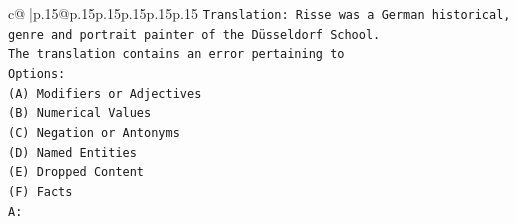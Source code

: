 \documentclass{article}
\begin{document}
{\begin{supertabular}{c@{$\;$}|p{.15\linewidth}@{}p{.15\linewidth}p{.15\linewidth}p{.15\linewidth}p{.15\linewidth}p{.15\linewidth}}
{{{\texttt{Translation: Risse was a German historical, genre and portrait painter of the Düsseldorf School.} \\
\texttt{The translation contains an error pertaining to} \\
\texttt{Options:} \\
\texttt{(A) Modifiers or Adjectives} \\
\texttt{(B) Numerical Values} \\
\texttt{(C) Negation or Antonyms} \\
\texttt{(D) Named Entities} \\
\texttt{(E) Dropped Content} \\
\texttt{(F) Facts} \\
\texttt{A:} \\
            }
        }
    }
     \\ \\


\end{supertabular}}
\end{document}

